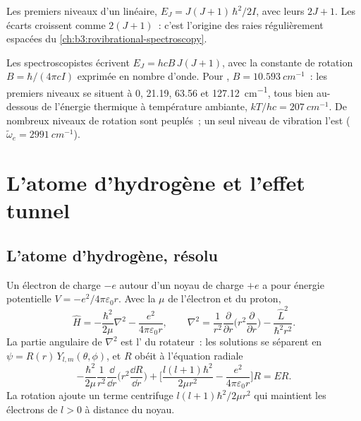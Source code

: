 \begin{omfigure}

{\small Les premiers niveaux d'un  linéaire,
$E_J = J(J+1)\,\hbar^2/2I$, avec leurs  $2J + 1$. Les
écarts croissent comme $2(J+1)$~: c'est l'origine des raies régulièrement
espacées du \cref{ch:b3:rovibrational-spectroscopy}.}
\end{omfigure}

\begin{example}\label{ex:b3:quantum-model-systems:hcl}
Les spectroscopistes écrivent $E_J = hcB\,J(J+1)$, avec la constante de
rotation $B =
\hbar/(4\pi cI)$ exprimée en nombre d'onde. Pour , $B = \qty{10.593}{cm^{-1}}$~:
les premiers niveaux se situent à 0, 21.19, 63.56 et \qty{127.12}{cm^{-1}},
tous bien au-dessous de l'énergie thermique à température ambiante,
$kT/hc = \qty{207}{cm^{-1}}$. De nombreux niveaux de rotation sont
peuplés~; un seul niveau de vibration l'est
($\tilde\omega_e = \qty{2991}{cm^{-1}}$).
\end{example}

\section{L'atome d'hydrogène et l'effet tunnel}

\subsection*{L'atome d'hydrogène, résolu}

Un électron de charge $-e$ autour d'un noyau de charge $+e$ a pour énergie
potentielle $V = -e^2/
4\pi\varepsilon_0r$. Avec la  $\mu$ de l'électron et du
proton,
\[
\hat H = -\frac{\hbar^2}{2\mu}\nabla^2 - \frac{e^2}{4\pi\varepsilon_0r},\qquad
\nabla^2 = \frac{1}{r^2}\frac{\partial}{\partial r}\Big(r^2\frac{\partial}{
\partial r}\Big) - \frac{\hat L^2}{\hbar^2r^2}.
\]
La partie angulaire de $\nabla^2$ est l' du rotateur~: les
solutions se séparent en $\psi = R(r)\,Y_{l,m}(\theta,\phi)$, et $R$ obéit
à l'équation radiale
\[
-\frac{\hbar^2}{2\mu}\frac{1}{r^2}\frac{\dd}{\dd r}\Big(r^2\frac{\dd R}{\dd r}
\Big) + \Big[\frac{l(l+1)\hbar^2}{2\mu r^2} - \frac{e^2}{4\pi\varepsilon_0r}
\Big]R = ER.
\]
La rotation ajoute un terme centrifuge $l(l+1)\hbar^2/2\mu r^2$ qui
maintient les électrons de $l > 0$ à distance du noyau.

